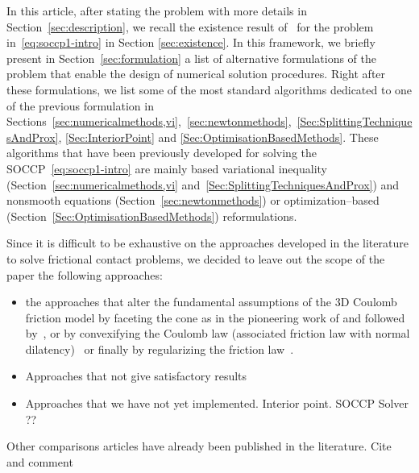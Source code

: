In this article,  after stating the problem with more details in Section~\ref{sec:description}, we recall the existence result of~\cite{Acary.ea_ZAMM2011} for the problem in~\eqref{eq:soccp1-intro} in Section \ref{sec:existence}. In this framework, we briefly present in Section~\ref{sec:formulation} a list of alternative formulations of the problem that enable the design of numerical solution procedures. Right after these formulations, we list some of the most standard algorithms dedicated to one of the previous formulation in Sections~\ref{sec:numericalmethods,vi},~\ref{sec:newtonmethods},~\ref{Sec:SplittingTechniquesAndProx}, \ref{Sec:InteriorPoint} and \ref{Sec:OptimisationBasedMethods}. These algorithms that have been previously developed for solving the SOCCP~\eqref{eq:soccp1-intro} are mainly based  variational inequality (Section~\ref{sec:numericalmethods,vi} and~\ref{Sec:SplittingTechniquesAndProx}) and nonsmooth equations (Section~\ref{sec:newtonmethods}) or  optimization--based (Section~\ref{Sec:OptimisationBasedMethods}) reformulations.  

Since it is difficult to be exhaustive on the approaches developed in the literature to solve frictional contact problems, we decided to leave out the scope of the paper the following approaches:
\begin{itemize}
\item the approaches that alter the fundamental assumptions of the 3D Coulomb friction model by faceting the cone as in the pioneering work of \cite{Klarbring1986} and followed by~\cite{AlFahed.Stavroulakis.ea1991,Pang.Trinkle1996,Stewart.Trinkle1996,Anitescu.Potra97,Haslinger.ea_JCAM2004}, or by convexifying the Coulomb law (associated friction law with normal dilatency)~\cite{Heyn.ea_IJNME2013,Tasora.Anistescu_Meccanica2013,Tasora.Anistescu_CMAME2011,Anistescu.Tasora_COA2010,Tasora.Anistescu_CMAME2009} or finally by regularizing the friction law~\cite{Kikuchi.Oden_SIAM1988}.
\item Approaches that not give satisfactory results
\item Approaches that we have not yet implemented. Interior point. SOCCP Solver ??
\end{itemize}

Other comparisons articles have already been published in the literature. Cite and comment

\begin{list}{}{}
\item \cite{Raous.ea1988,Chabrand.ea_MCM1998}
\item \cite{Christensen.Klarbring.ea1998}
\item \cite{Mijar.Arora_SMO2000,Mijar.Arora_ACME2000,Mirar.Arora_SMO2004-I,Mirar.Arora_SMO2004-II}
\end{list}


